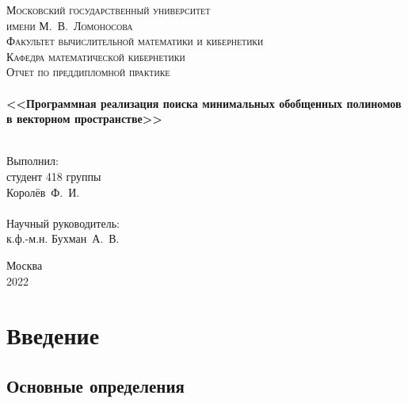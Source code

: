 \documentclass[a4paper,12pt,titlepage,finall]{article}
\begin{document}
\begin{titlepage}
    \begin{center}
    \textsc{\small Московский государственный университет \\имени М.~В.~Ломоносова\\
    Факультет вычислительной математики и кибернетики\\Кафедра математической кибернетики\\}
    \vfill
    \textsc{\Large Отчет по преддипломной практике}\\
    ~\\
    \textbf{\large <<Программная реализация поиска минимальных обобщенных полиномов в векторном пространстве>>}\\
    ~\\
    \end{center}
    \begin{flushright}
    \vfill {Выполнил:\\
    студент 418 группы\\
    Королёв~Ф.~И.\\
    ~\\
    Научный руководитель:\\
    к.ф.-м.н. Бухман~А.~В.}
    \end{flushright}
    \begin{center}
    \vfill
    {\small Москва\\2022}
    \end{center}
\end{titlepage}

\tableofcontents
\newpage

\section{Введение}

\subsection{Основные определения}
\end{document}
